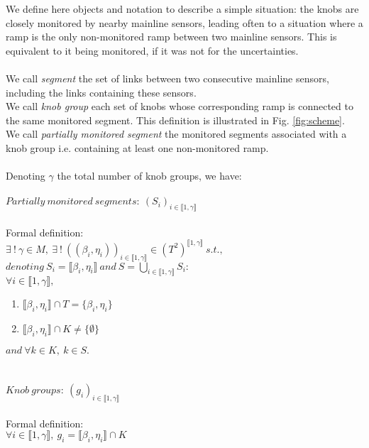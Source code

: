 We define here objects and notation to describe a simple situation: the knobs are closely monitored by nearby mainline sensors, leading often to a situation where a ramp is the only non-monitored ramp between two mainline sensors. This is equivalent to it being monitored, if it was not for the uncertainties.\\
\\
We call \emph{segment} the set of links between two consecutive mainline sensors, including the links containing these sensors. \\
We call \emph{knob group} each set of knobs whose corresponding ramp is connected to the same monitored segment.
This definition is illustrated in Fig. \ref{fig:scheme}.\\
We call \emph{partially monitored segment} the monitored segments associated with a knob group i.e. containing at least one non-monitored ramp.\\
\\
Denoting $\gamma$ the total number of knob groups, we have:\\
\\
$Partially\ monitored\ segments:\ (S_{i})_{i \in \llbracket 1,\gamma \rrbracket}$\\ 
\\
Formal definition:\\
$\exists\ !\ \gamma\in M,\ \exists\ !\ ((\beta_{i},\eta_{i}))_{i\in\llbracket 1,\gamma\rrbracket}\in (T^2)^{\llbracket 1,\gamma\rrbracket}\ s.t.,$\\
$denoting\ S_{i}=\llbracket \beta_{i},\eta_{i} \rrbracket\ and\ S=\underset{i\in \llbracket 1,\gamma \rrbracket}{\bigcup}  S_{i}:$\\
$\forall i\in\llbracket 1,\gamma \rrbracket,$
\begin{enumerate}
	\item $\llbracket \beta_{i},\eta_{i} \rrbracket \cap T=\{\beta_{i},\eta_{i}\}$
	\item $\llbracket \beta_{i}, \eta_{i} \rrbracket \cap K\not= \{\emptyset \}$
\end{enumerate}
$and\ \forall k\in K,\ k\in S.$\\
\\
\\
$Knob\ groups:\ (g_{i})_{i\in \llbracket 1,\gamma \rrbracket}$\\
\\
Formal definition:\\
$\forall i \in \llbracket 1, \gamma \rrbracket,\ g_{i}=\llbracket \beta_{i}, \eta_{i} \rrbracket \cap K $\\
